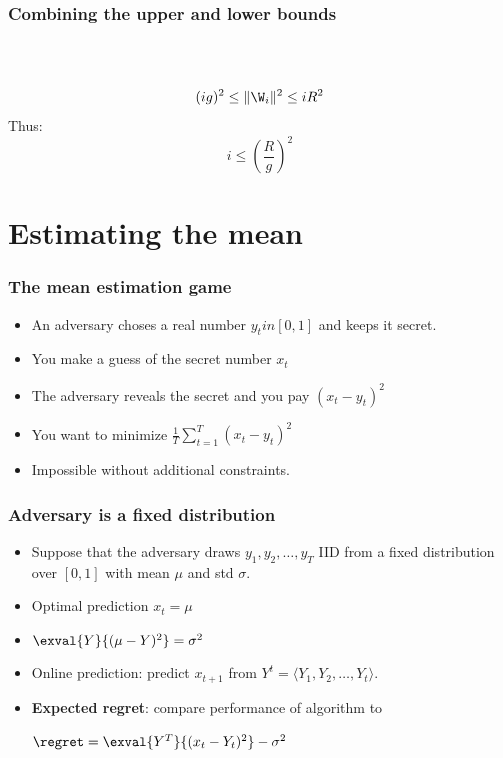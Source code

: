 \documentclass{beamer}
\begin{document}
\begin{frame}
\frametitle{Combining the upper and lower bounds}
~\\
~\\
\pause
$$(ig)^2 \leq \|\W_i\|^2 \leq i R^2$$
\pause
Thus:
$$ i \leq \left(\frac{R}{g} \right)^2 $$
\end{frame}

\section{Estimating the mean}

\begin{frame}
\frametitle{The mean estimation game}
\begin{itemize}
\item 
An adversary choses a real number $y_t in [0,1]$ and keeps it secret.
\item
You make a guess of the secret number $x_t$
\item
The adversary reveals the secret and you pay $(x_t-y_t)^2$ 
\end{itemize}
\begin{itemize}
\item You want to minimize $\frac{1}{T}\sum_{t=1}^T \left(x_t-y_t \right)^2$
\item Impossible without additional constraints.
\end{itemize}
\end{frame}

\begin{frame}
\frametitle{Adversary is a fixed distribution}
\begin{itemize}
\item 
Suppose that the adversary draws $y_1,y_2,\ldots,y_T$ IID from a fixed
distribution over $[0,1]$ with mean $\mu$ and std $\sigma$.
\item
Optimal prediction $x_t = \mu$ 
\item 
  $\exval{Y}{(\mu-Y)^2} = \sigma^2$
\item Online prediction: predict $x_{t+1}$ from $Y^t = \langle
  Y_1,Y_2,\ldots,Y_t \rangle$.
\item {\bf Expected regret}: compare performance of algorithm to
  
  $ \regret = \exval{Y^T}{(x_t-Y_t)^2} - \sigma^2$
\end{itemize}
\end{frame}
\end{document}
